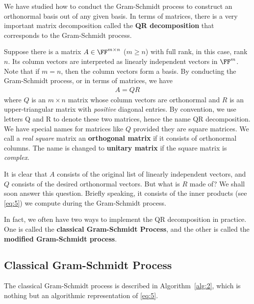 \documentclass[thmcnt=section, color=blue, 12pt]{my-elegantbook}
\begin{document}
We have studied how to conduct the Gram-Schmidt process to construct an orthonormal basis out of any given basis. In terms of matrices, there is a very important matrix decomposition called the \textbf{QR decomposition} that corresponds to the Gram-Schmidt process. 

Suppose there is a matrix $A \in \FF^{m \times n}$ ($m \geq n$) with full rank, in this case, rank $n$. Its column vectors are interpreted as linearly independent vectors in $\FF^m$. Note that if $m = n$, then the column vectors form a basis. By conducting the Gram-Schmidt process, or in terms of matrices, we have 
\begin{align*}
    A = QR
\end{align*}
where $Q$ is an $m \times n$ matrix whose column vectors are orthonormal and $R$ is an upper-triangular matrix with \textit{positive} diagonal entries. By convention, we use letters Q and R to denote these two matrices, hence the name QR decomposition. We have special names for matrices like $Q$ provided they are square matrices. We call a \textit{real} \textit{square} matrix an \textbf{orthogonal matrix} if it consists of orthonormal columns. The name is changed to \textbf{unitary matrix} if the square matrix is \textit{complex}.

It is clear that $A$ consists of the original list of linearly independent vectors, and $Q$ consists of the desired orthonormal vectors. But what is $R$ made of? We shall soon answer this question. Briefly speaking, it consists of the inner products (see \eqref{eq:5}) we compute during the Gram-Schmidt process.

In fact, we often have two ways to implement the QR decomposition in practice. One is called the \textbf{classical Gram-Schmidt Process}, and the other is called the \textbf{modified Gram-Schmidt process}.


\subsection{Classical Gram-Schmidt Process}

The classical Gram-Schmidt process is described in Algorithm~\ref{alg:2}, which is nothing but an algorithmic representation of \eqref{eq:5}.
\end{document}

